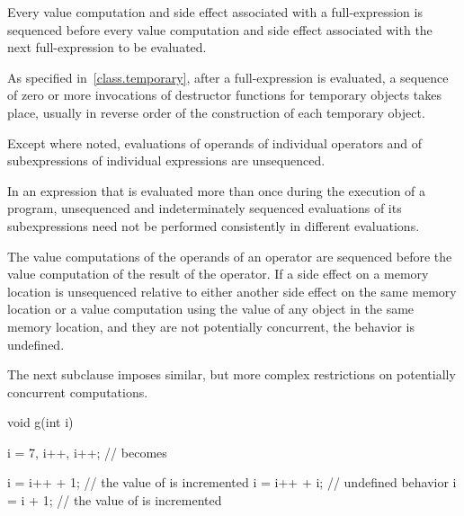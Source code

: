 \pnum
Every
%
value computation and
%
side effect associated with a full-expression is
sequenced before every value computation and side effect associated with the
next full-expression to be evaluated.
\begin{footnote}
As specified
in~\ref{class.temporary}, after a full-expression is evaluated, a sequence of
zero or more invocations of destructor functions for temporary objects takes
place, usually in reverse order of the construction of each temporary object.
\end{footnote}

\pnum
{}%
Except where noted, evaluations of operands of individual operators and
of subexpressions of individual expressions are unsequenced.
\begin{note}
In an expression that is evaluated more than once during the execution
of a program, unsequenced and indeterminately sequenced evaluations of
its subexpressions need not be performed consistently in different
evaluations.
\end{note}
The value computations of the operands of an
operator are sequenced before the value computation of the result of the
operator. If a
%
side effect on a memory location is unsequenced
relative to either another side effect on the same memory location or
a value computation using the value of any object in the same memory location,
and they are not potentially concurrent,
the behavior is undefined.
\begin{note}
The next subclause imposes similar, but more complex restrictions on
potentially concurrent computations.
\end{note}

\begin{example}
\begin{codeblock}
void g(int i) {
  i = 7, i++, i++;              //  becomes 

  i = i++ + 1;                  // the value of  is incremented
  i = i++ + i;                  // undefined behavior
  i = i + 1;                    // the value of  is incremented
}
\end{codeblock}
\end{example}

